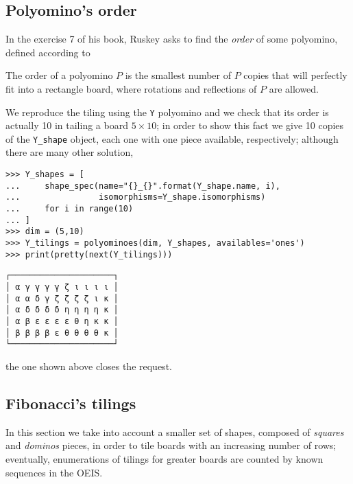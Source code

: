 \subsection{Polyomino's order}

In the exercise 7 of his book, Ruskey asks to find the \textit{order} of some
polyomino, defined according to

\begin{definition}
The order of a polyomino $P$ is the smallest number of $P$ copies that will
perfectly fit into a rectangle board, where rotations and reflections of $P$
are allowed.
\end{definition}

We reproduce the tiling using the \verb|Y| polyomino and we check that its
order is actually 10 in tailing a board $5\times 10$; in order to show this
fact we give 10 copies of the \verb|Y_shape| object, each one with one piece
available, respectively; although there are many other solution,
\begin{verbatim}
>>> Y_shapes = [
...     shape_spec(name="{}_{}".format(Y_shape.name, i),
...                isomorphisms=Y_shape.isomorphisms)
...     for i in range(10)
... ]
>>> dim = (5,10)
>>> Y_tilings = polyominoes(dim, Y_shapes, availables='ones')
>>> print(pretty(next(Y_tilings)))
\end{verbatim}
\begin{Verbatim}[baselinestretch=0.1]
┌─────────────────────┐
│ α γ γ γ γ ζ ι ι ι ι │
│ α α δ γ ζ ζ ζ ζ ι κ │
│ α δ δ δ δ η η η η κ │
│ α β ε ε ε ε θ η κ κ │
│ β β β β ε θ θ θ θ κ │
└─────────────────────┘
\end{Verbatim}
the one shown above closes the request.

\subsection{Fibonacci's tilings}

In this section we take into account a smaller set of shapes, composed of
\textit{squares} and \textit{dominos} pieces, in order to tile boards with an
increasing number of rows; eventually, enumerations of tilings for greater
boards are counted by known sequences in the OEIS.

\inputminted[baselinestretch=0.8,stripnl=false, firstline=514,lastline=530]
    {python}{backtracking/polyominoes.py}

